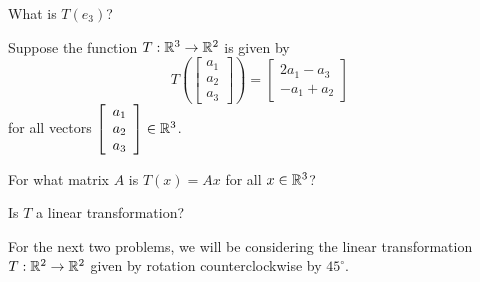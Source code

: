 What is $T(e_3)$?  





\edXsolution{ 

}


\endedxproblem


Suppose the function $T: \mathbb R^3\rightarrow \mathbb R^2$ is given by 
\[T\left( \left[ \begin{array}{c} a_1 \\ a_2\\ a_3 \end{array} \right] \right) =\left[ \begin{array}{c} 2a_1-a_3 \\ -a_1 + a_2 \end{array} \right] \] 
for all vectors $\left[ \begin{array}{c} a_1 \\ a_2\\ a_3 \end{array} \right]  \in \mathbb R^3$.  

For what matrix $A$ is $T(x) = Ax$ for all $x \in \mathbb R^3$?  




Is $T$ a linear transformation?  



\edXsolution{ 

}


\endedxproblem


\endedxvertical








For the next two problems, we will be considering the linear transformation $T: \mathbb R^2 \rightarrow \mathbb R^2$
given by rotation counterclockwise by $45^\circ$.  


\begin{center}
 

\end{center}

